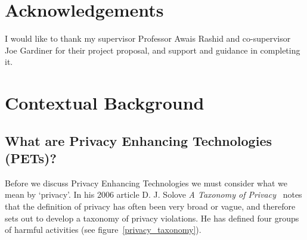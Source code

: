 \documentclass[
    author={Jacob Daniel Halsey},
    supervisor={Prof. Awais Rashid},
    degree={BSc},
    title={Building a Testbed for Evaluating Privacy Enhancing Technologies  (PETs)},
    subtitle={},
    type={software development},
    year={2021}
]{dissertation}
\begin{document}
\chapter*{Acknowledgements}

I would like to thank my supervisor Professor Awais Rashid and co-supervisor Joe Gardiner for their
project proposal, and support and guidance in completing it.

\mainmatter


\chapter{Contextual Background}
\label{chap:context}

\section{What are Privacy Enhancing Technologies (PETs)?}

Before we discuss Privacy Enhancing Technologies we must consider what we mean by `privacy'. 
In his 2006 article D. J. Solove  \emph{A Taxonomy of Privacy}~\cite{solove_privacy} notes that the
definition of privacy has often been very broad or vague, and therefore sets out to develop
a taxonomy of privacy violations. He has defined four groups of harmful activities (see figure~\ref{privacy_taxonomy}). \\
\end{document}
